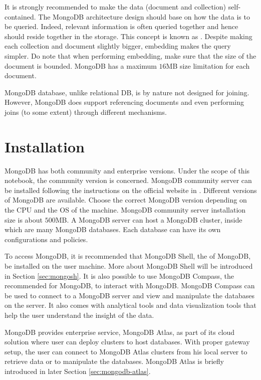 It is strongly recommended to make the data (document and collection) self-contained. The MongoDB architecture design should base on how the data is to be queried. Indeed, relevant information is often queried together and hence should reside together in the storage. This concept is known as . Despite making each collection and document slightly bigger, embedding makes the query simpler. Do note that when performing embedding, make sure that the size of the document is bounded. MongoDB has a maximum $16$MB size limitation for each document.

MongoDB database, unlike relational DB, is by nature not designed for joining. However, MongoDB does support referencing documents and even performing joins (to some extent) through different mechanisms.

\section{Installation}

MongoDB has both community and enterprise versions. Under the scope of this notebook, the community version is concerned. MongoDB community server can be installed following the instructions on the official website in \cite{mongodb_community_server}. Different versions of MongoDB are available. Choose the correct MongoDB version depending on the CPU and the OS of the machine. MongoDB community server installation size is about $500$MB. A MongoDB server can host a MongoDB cluster, inside which are many MongoDB databases. Each database can have its own configurations and policies.

To access MongoDB, it is recommended that MongoDB Shell, the  of MongoDB, be installed on the user machine. More about MongoDB Shell will be introduced in Section \ref{sec:mongosh}. It is also possible to use MongoDB Compass, the recommended  for MongoDB, to interact with MongoDB. MongoDB Compass can be used to connect to a MongoDB server and view and manipulate the databases on the server. It also comes with analytical tools and data visualization tools that help the user understand the insight of the data.

MongoDB provides enterprise service, MongoDB Atlas, as part of its cloud solution where user can deploy clusters to host databases. With proper gateway setup, the user can connect to MongoDB Atlas clusters from his local server to retrieve data or to manipulate the databases. MongoDB Atlas is briefly introduced in later Section \ref{sec:mongodb-atlas}.

